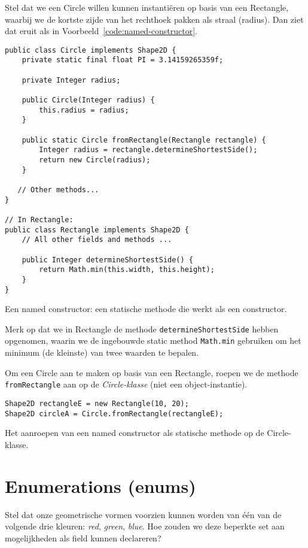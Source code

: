 Stel dat we een Circle willen kunnen instantiëren op basis van een Rectangle, waarbij we 
de kortste zijde van het rechthoek pakken als straal (radius). Dan ziet dat eruit als 
in Voorbeeld~\ref{code:named-constructor}.

\begin{listing}[H]
\begin{verbatim}
public class Circle implements Shape2D {
    private static final float PI = 3.14159265359f;

    private Integer radius;

    public Circle(Integer radius) {
        this.radius = radius;
    }

    public static Circle fromRectangle(Rectangle rectangle) {
        Integer radius = rectangle.determineShortestSide();
        return new Circle(radius);
    }

   // Other methods...
}

// In Rectangle:
public class Rectangle implements Shape2D {
    // All other fields and methods ...
    
    public Integer determineShortestSide() {
        return Math.min(this.width, this.height);
    }
}
\end{verbatim}
\caption{Een named constructor: een statische methode die werkt als een constructor.}
\label{code:named-constructor}
\end{listing}

Merk op dat we in Rectangle de methode \texttt{determineShortestSide} hebben opgenomen,
waarin we de ingebouwde static method \texttt{Math.min} gebruiken om het minimum 
(de kleinste) van twee waarden te bepalen. 

Om een Circle aan te maken op basis van een Rectangle, roepen we de methode 
\texttt{fromRectangle} aan op de \emph{Circle-klasse} (niet een object-instantie).
\begin{listing}[H]
\begin{verbatim}
Shape2D rectangleE = new Rectangle(10, 20);
Shape2D circleA = Circle.fromRectangle(rectangleE);
\end{verbatim}
\caption{Het aanroepen van een named constructor als statische methode op de Circle-klasse.}
\label{code:named-constructor-invocation}
\end{listing}

\section{Enumerations (enums)}
Stel dat onze geometrische vormen voorzien kunnen worden van 
één van de volgende drie kleuren: \textit{red}, \textit{green}, \textit{blue}.
Hoe zouden we deze beperkte set aan mogelijkheden als field kunnen declareren?

